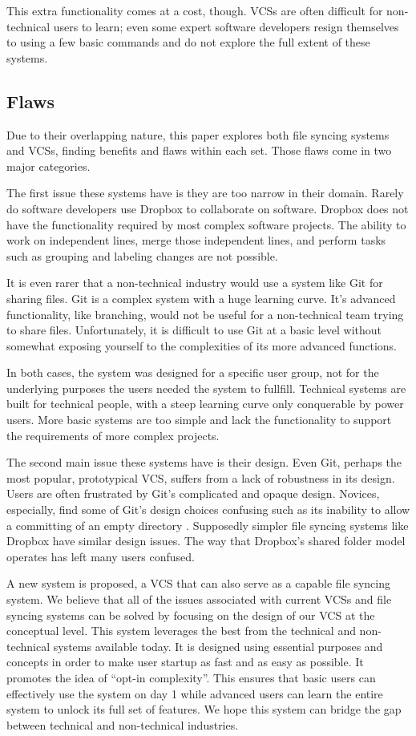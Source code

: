 This extra functionality comes at a cost, though. VCSs are often difficult for non-technical users to learn; even some expert software developers resign themselves to using a few basic commands and do not explore the full extent of these systems. 

\subsection{Flaws}

Due to their overlapping nature, this paper explores both file syncing systems and VCSs, finding benefits and flaws within each set. Those flaws come in two major categories.

The first issue these systems have is they are too narrow in their domain. Rarely do software developers use Dropbox to collaborate on software. Dropbox does not have the functionality required by most complex software projects. The ability to work on independent lines, merge those independent lines, and perform tasks such as grouping and labeling changes are not possible.

It is even rarer that a non-technical industry would use a system like Git for sharing files. Git is a complex system with a huge learning curve. It's advanced functionality, like branching, would not be useful for a non-technical team trying to share files. Unfortunately, it is difficult to use Git at a basic level without somewhat exposing yourself to the complexities of its more advanced functions.

In both cases, the system was designed for a specific user group, not for the underlying purposes the users needed the system to fullfill. Technical systems are built for technical people, with a steep learning curve only conquerable by power users. More basic systems are too simple and lack the functionality to support the requirements of more complex projects.

The second main issue these systems have is their design. Even Git, perhaps the most popular, prototypical VCS, suffers from a lack of robustness in its design. Users are often frustrated by Git's complicated and opaque design. Novices, especially, find some of Git's design choices confusing such as its inability to allow a committing of an empty directory \cite{RossoJackson}. Supposedly simpler file syncing systems like Dropbox have similar design issues. The way that Dropbox's shared folder model operates has left many users confused\cite{Zhang}.

A new system is proposed, a VCS that can also serve as a capable file syncing system. We believe that all of the issues associated with current VCSs and file syncing systems can be solved by focusing on the design of our VCS at the conceptual level. This system leverages the best from the technical and non-technical systems available today. It is designed using essential purposes and concepts in order to make user startup as fast and as easy as possible. It promotes the idea of ``opt-in complexity''. This ensures that basic users can effectively use the system on day 1 while advanced users can learn the entire system to unlock its full set of features. We hope this system can bridge the gap between technical and non-technical industries. 

